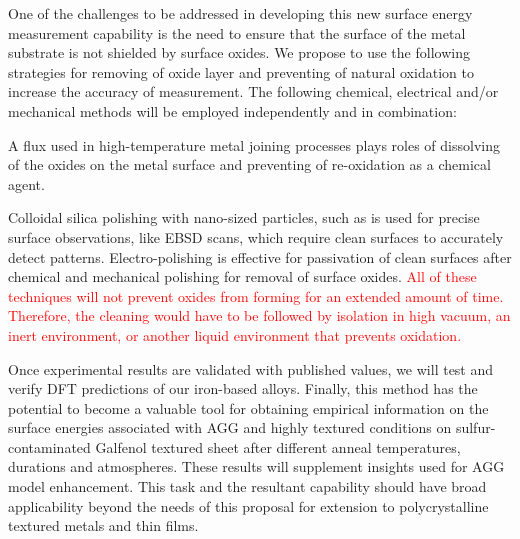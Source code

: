 One of the challenges to be addressed in developing this new surface energy measurement capability is the need to ensure that the surface of the metal substrate is not shielded by surface oxides. We propose to use the following strategies for removing of oxide layer and preventing of natural oxidation to increase the accuracy of measurement. The following chemical, electrical and/or mechanical methods will be employed independently and in combination:
\begin{outline}
	\1 A flux used in high-temperature metal joining processes plays roles of dissolving of the oxides on the metal surface and preventing of re-oxidation as a chemical agent.
		
	\1 Colloidal silica polishing with nano-sized particles, such as is used for precise surface observations, like EBSD scans, which require clean surfaces to accurately detect patterns.
	\1 Electro-polishing is effective for passivation of clean surfaces after chemical and mechanical polishing for removal of surface oxides. 
	\1 \textcolor{red}{All of these techniques will not prevent oxides from forming for an extended amount of time. Therefore, the cleaning would have to be followed by isolation in high vacuum, an inert environment, or another liquid environment that prevents oxidation.} 
\end{outline}

Once experimental results are validated with published values, we will test and verify DFT predictions of our iron-based alloys. Finally, this method has the potential to become a valuable tool for obtaining empirical information on the surface energies associated with AGG and highly textured conditions on sulfur-contaminated Galfenol textured sheet after different anneal temperatures, durations and atmospheres. These results will supplement insights used for AGG model enhancement. This task and the resultant capability should have broad applicability beyond the needs of this proposal for extension to polycrystalline textured metals and thin films.





